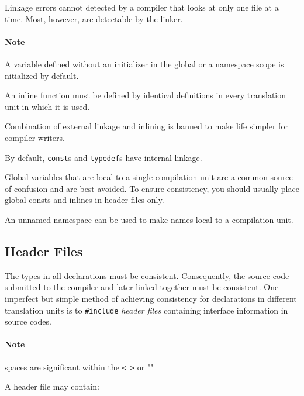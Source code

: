 \documentclass[11pt, a4paper]{book}
\begin{document}
Linkage errors cannot detected by a compiler that looks at only one file at a time. Most, however, are detectable by the linker. 
\paragraph{Note} A variable defined without an initializer in the global or a namespace scope is nitialized by default. 

An inline function must be defined by identical definitions in every translation unit in which it is used.

Combination of external linkage and inlining is banned to make life simpler for compiler writers.

By default, \verb|const|s and \verb|typedef|s have internal linkage.

Global variables that are local to a single compilation unit are a common source of confusion and are best avoided. To ensure consistency, you should usually place global consts and inlines in header files only.

An unnamed namespace can be used to make names local to a compilation unit. 
\subsection{Header Files}
The types in all declarations must be consistent. Consequently, the source code submitted to the compiler and later linked together must be consistent. One imperfect but simple method of achieving consistency for declarations in different translation units is to \verb|#include| \emph{header files} containing interface information in source codes.

\paragraph{Note} spaces are significant within the \verb|< >| or ""

A header file may contain:
\end{document}
